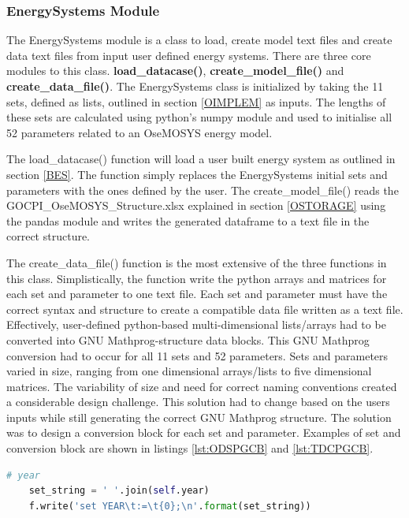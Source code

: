 \documentclass[12pt]{article}
\begin{document}
\subsubsection{EnergySystems Module} \label{ESM}
The EnergySystems module is a class to load, create model text files and create data text files from input user defined energy systems. 
There are three core modules to this class. \textbf{load\_datacase()}, \textbf{create\_model\_file()} and \textbf{create\_data\_file()}.
The EnergySystems class is initialized by taking the 11 sets, defined as lists, outlined in section \ref{OIMPLEM} as inputs. 
The lengths of these sets are calculated using python's numpy module and used to initialise all 52 parameters related to an OseMOSYS energy model.

The load\_datacase() function will load a user built energy system as outlined in section \ref{BES}. 
The function simply replaces the EnergySystems initial sets and parameters with the ones defined by the user.
The create\_model\_file() reads the GOCPI\_OseMOSYS\_Structure.xlsx explained in section \ref{OSTORAGE} using the pandas module and writes the generated dataframe to a text file in the correct structure.

The create\_data\_file() function is the most extensive of the three functions in this class.
Simplistically, the function write the python arrays and matrices for each set and parameter to one text file.
Each set and parameter must have the correct syntax and structure to create a compatible data file written as a text file.
Effectively, user-defined python-based multi-dimensional lists/arrays had to be converted into GNU Mathprog-structure data blocks.
This GNU Mathprog conversion had to occur for all 11 sets and 52 parameters.
Sets and parameters varied in size, ranging from one dimensional arrays/lists to five dimensional matrices.
The variability of size and need for correct naming conventions created a considerable design challenge.
This solution had to change based on the users inputs while still generating the correct GNU Mathprog structure.
The solution was to design a conversion block for each set and parameter. 
Examples of set and conversion block are shown in listings \ref{lst:ODSPGCB} and \ref{lst:TDCPGCB}.

\begin{lstlisting}[language=Python,label = {lst:ODSPGCB},caption = {One Dimensional Set Python to GNU Mathprog Conversion Block}]
	# year
	set_string = ' '.join(self.year)
	f.write('set YEAR\t:=\t{0};\n'.format(set_string))
\end{lstlisting}
\end{document}
